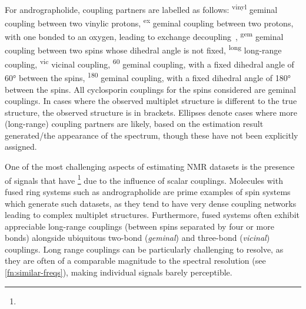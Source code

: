 \begin{table}
{    For andrographolide, coupling partners are labelled as follows:
    \textsuperscript{vinyl} geminal coupling between two vinylic protons,
    \textsuperscript{ex} geminal coupling between two protons, with one
    bonded to an oxygen, leading to exchange decoupling~\cite[Section
    2.6.1.5]{Claridge2016},
    \textsuperscript{gem} geminal coupling between two spins whose dihedral
    angle is not fixed,
    \textsuperscript{long} long-range coupling,
    \textsuperscript{vic} vicinal coupling,
    \textsuperscript{60} geminal coupling, with a fixed dihedral angle of
    \ang{60} between the spins,
    \textsuperscript{180} geminal coupling, with a fixed dihedral angle of
    \ang{180} between the spins.
    All cyclosporin couplings for the spins considered are geminal couplings.
    In cases where the observed multiplet structure is different to the true
    structure, the observed structure is in brackets. Ellipses denote cases
    where more (long-range) coupling partners are likely, based on the
    estimation result generated/the appearance of the spectrum, though these
    have not been explicitly assigned.
}
\label{tab:andro-multiplets}
\end{table}

One of the most challenging aspects of estimating \ac{NMR} datasets is
the presence of signals that have \footnote{
}
due to the influence of scalar couplings.
Molecules with fused ring systems such as andrographolide are prime examples of spin
systems which generate such datasets, as they tend to have very dense coupling
networks leading to complex multiplet structures. Furthermore, fused systems often
exhibit appreciable long-range couplings (between spins separated by four or
more bonds) alongside ubiquitous two-bond (\emph{geminal}) and three-bond
(\emph{vicinal}) couplings. Long range couplings can be particularly challenging to
resolve, as they are often of a comparable magnitude to the spectral resolution
(see \cref{fn:similar-freqs}), making individual signals barely perceptible.

